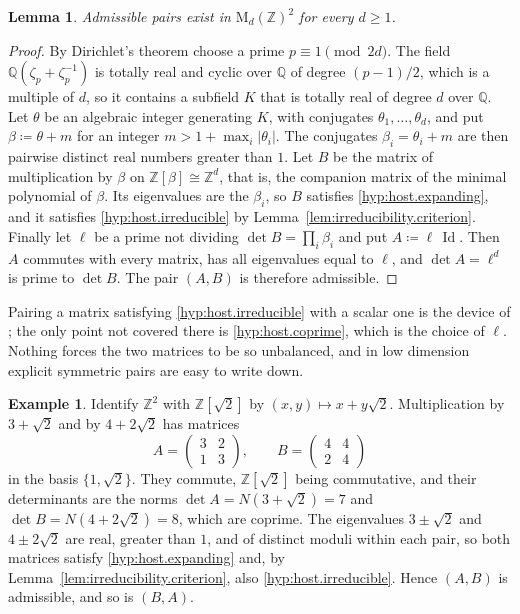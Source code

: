 \documentclass[11pt,reqno]{amsart}
\theoremstyle{plain}
\newtheorem{lem}[thm]{Lemma}
\theoremstyle{definition}
\newtheorem{exm}[thm]{Example}
\newcommand{\Z}{\mathbb{Z}}
\newcommand{\Q}{\mathbb{Q}}
\DeclareMathOperator{\Id}{Id}
\begin{document}
\begin{lem}
\label{lem:existence.pairs}
    Admissible pairs exist in \( \mathrm M_d(\Z)^2 \) for every \( d\ge1 \).
\end{lem}

\begin{proof}
    By Dirichlet's theorem choose a prime \( p\equiv1 \pmod{2d} \).
    The field \( \Q(\zeta_p+\zeta_p^{-1}) \) is totally real and cyclic over \( \Q \) of degree \( (p-1)/2 \), which is a multiple of \( d \), so it contains a subfield \( K \) that is totally real of degree \( d \) over \( \Q \).
    Let \( \theta \) be an algebraic integer generating \( K \), with conjugates \( \theta_1,\dots,\theta_d \), and put \( \beta\coloneqq\theta+m \) for an integer \( m>1+\max_i\lvert\theta_i\rvert \).
    The conjugates \( \beta_i=\theta_i+m \) are then pairwise distinct real numbers greater than \( 1 \).
    Let \( B \) be the matrix of multiplication by \( \beta \) on \( \Z[\beta]\cong\Z^d \), that is, the companion matrix of the minimal polynomial of \( \beta \).
    Its eigenvalues are the \( \beta_i \), so \( B \) satisfies \ref{hyp:host.expanding}, and it satisfies \ref{hyp:host.irreducible} by Lemma~\ref{lem:irreducibility.criterion}.
    Finally let \( \ell \) be a prime not dividing \( \det B=\prod_i\beta_i \) and put \( A\coloneqq\ell\,\Id \).
    Then \( A \) commutes with every matrix, has all eigenvalues equal to \( \ell \), and \( \det A=\ell^d \) is prime to \( \det B \).
    The pair \( (A,B) \) is therefore admissible.
\end{proof}

Pairing a matrix satisfying \ref{hyp:host.irreducible} with a scalar one is the device of \cite[Example 6.1]{berend_multi_1983}; the only point not covered there is \ref{hyp:host.coprime}, which is the choice of \( \ell \).
Nothing forces the two matrices to be so unbalanced, and in low dimension explicit symmetric pairs are easy to write down.

\begin{exm}
\label{exmp:admissible.pair}
    Identify \( \Z^2 \) with \( \Z[\sqrt2] \) by \( (x,y)\mapsto x+y\sqrt2 \).
    Multiplication by \( 3+\sqrt2 \) and by \( 4+2\sqrt2 \) has matrices
    \[
        A=\begin{pmatrix}3&2\\1&3\end{pmatrix},
        \qquad
        B=\begin{pmatrix}4&4\\2&4\end{pmatrix}
    \]
    in the basis \( \{1,\sqrt2\} \).
    They commute, \( \Z[\sqrt2] \) being commutative, and their determinants are the norms \( \det A=N(3+\sqrt2)=7 \) and \( \det B=N(4+2\sqrt2)=8 \), which are coprime.
    The eigenvalues \( 3\pm\sqrt2 \) and \( 4\pm2\sqrt2 \) are real, greater than \( 1 \), and of distinct moduli within each pair, so both matrices satisfy \ref{hyp:host.expanding} and, by Lemma~\ref{lem:irreducibility.criterion}, also \ref{hyp:host.irreducible}.
    Hence \( (A,B) \) is admissible, and so is \( (B,A) \).
\end{exm}
\end{document}
